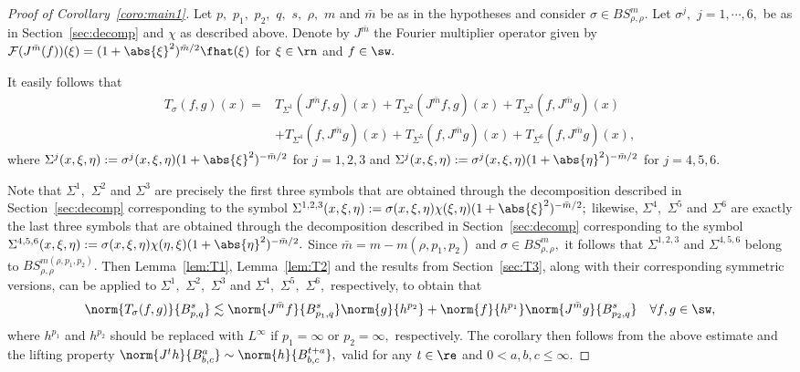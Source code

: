 \begin{proof}[Proof of Corollary~\ref{coro:main1}]
 Let $p,$ $p_1,$ $p_2,$ $q,$ $s,$ $\rho,$ $m$  and $\bar{m}$ be as in the hypotheses and consider $\sigma\in BS^m_{\rho,\rho}.$  Let $\sigma^j,$ $j=1,\cdots,6,$  be as in Section~\ref{sec:decomp} and $\chi$ as described above. Denote by  $ J^{\bar{m}}$ the Fourier multiplier operator given by $\mathcal{F}(J^{\bar{m}}(f))(\xi)=(1+\abs{\xi}^2)^{{\bar{m}}/2}\fhat(\xi)$ for $\xi\in \rn$ and $f\in \sw.$ 

It easily follows that
\begin{align*}
T_{\sigma}(f,g)(x)=&T_{\Sigma^1}(J^{\bar{m}}f, g)(x) +T_{\Sigma^2} (J^{\bar{m}}f, g)(x) + T_{\Sigma^3}(f,J^{\bar{m}}g)(x)\\ &+T_{\Sigma^4} (f, J^{\bar{m}}g)(x)+T_{\Sigma^5} (f, J^{\bar{m}}g)(x)+T_{\Sigma^6} (f, J^{\bar{m}}g)(x), 
\end{align*}
where $\Sigma^j(x,\xi,\eta):=\sigma^j(x,\xi,\eta)(1+\abs{\xi}^2)^{-\bar{m}/2}$ for $j=1,2,3$ and  $\Sigma^j(x,\xi,\eta):=\sigma^j(x,\xi,\eta)(1+\abs{\eta}^2)^{-\bar{m}/2}$ for $j=4,5,6.$

 Note that $\Sigma^1,$ $\Sigma^2$ and $\Sigma^3$ are precisely  the first three symbols that are obtained through the decomposition described in Section~\ref{sec:decomp} corresponding to the symbol $\Sigma^{1,2,3}(x,\xi,\eta):=\sigma(x,\xi,\eta)\chi(\xi,\eta)(1+\abs{\xi}^2)^{-\bar{m}/2};$ likewise, $\Sigma^4,$  $\Sigma^5$ and $\Sigma^6$  are exactly the last three symbols that are obtained through the decomposition described in Section~\ref{sec:decomp} corresponding to the symbol $\Sigma^{4,5,6}(x,\xi,\eta):=\sigma(x,\xi,\eta)\chi(\eta,\xi)(1+\abs{\eta}^2)^{-\bar{m}/2}.$  Since $\bar{m}=m-m(\rho,p_1,p_2)$ and $\sigma\in BS^m_{\rho,\rho},$ it follows that  $\Sigma^{1,2,3}$ and $\Sigma^{4,5,6}$ belong to $BS^{m(\rho,p_1,p_2)}_{\rho,\rho}.$ Then Lemma~\ref{lem:T1}, Lemma~\ref{lem:T2} and the results from Section~\ref{sec:T3}, along with their corresponding symmetric versions, can be applied to $\Sigma^1,$ $\Sigma^2,$ $\Sigma^3$ and $\Sigma^4,$ $\Sigma^5,$ $\Sigma^6,$ respectively, to obtain that 
\[
\norm{T_\sigma(f,g)}{B^s_{p,q}}\lesssim \norm{J^{\bar{m}}f}{B^s_{p_1,q}}\norm{g}{h^{p_2}}+\norm{f}{h^{p_1}}\norm{J^{\bar{m}}g}{B^s_{p_2,q}}\quad \forall f,g\in \sw,
\]
where $h^{p_1}$ and $h^{p_2}$ should be replaced with $L^\infty$ if $p_1=\infty$  or $p_2=\infty,$ respectively. The corollary then follows from the above estimate and  the lifting property  $\norm{J^{t}h}{B^{a}_{b,c}}\sim \norm{h}{B^{t+a}_{b,c}},$ valid for any  $t\in \re$ and $0<a,b,c\le \infty.$
\end{proof}



